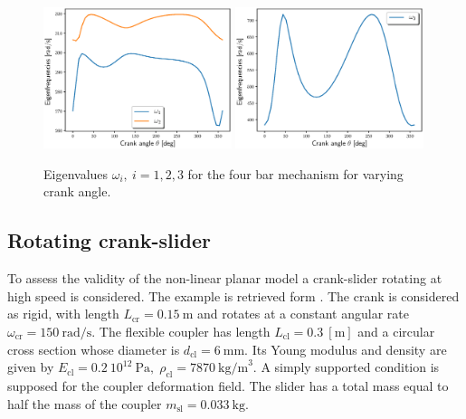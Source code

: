 \documentclass{svjour3}                     %
\begin{document}
\begin{figure}[tb]
	\centering
	\includegraphics[width=0.49\textwidth]{FourBar_Om12.eps} 
	\includegraphics[width=0.49\textwidth]{FourBar_Om3.eps} 
	\caption{Eigenvalues $\omega_i, \ i=1,2,3$ for the four bar mechanism for varying crank angle.}
	\label{fig:omega_4bars}
\end{figure}

\subsection{Rotating crank-slider}
To assess the validity of the non-linear planar model a crank-slider rotating at high speed is considered. The example is retrieved form \cite{Ellenbroek2018}.  The crank is considered as rigid, with length $L_{\text{cr}} = 0.15 \ \mathrm{m}$ and rotates at a constant angular rate $\omega_{\text{cr}} = 150 \ \mathrm{rad/s}$. The flexible coupler has length $L_{\text{cl}} = 0.3 \ [\mathrm{m}]$ and a circular cross section whose diameter is $d_{\text{cl}} = 6 \ \mathrm{mm}$. Its Young modulus and density are given by $E_{\text{cl}}=0.2 \ 10^{12} \ \mathrm{Pa}, \; \rho_{\text{cl}}=7870 \ \mathrm{kg/m}^3$. A simply supported condition is supposed for the coupler deformation field. The slider has a total mass equal to half the mass of the coupler $m_{\text{sl}} = 0.033 \ \mathrm{kg}$. 
\end{document}
